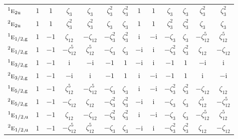 \documentclass[10pt,a4paper]{article}
\makeatletter
\def\grouprule#1#2{\noalign{\marks\LTgroupmarks{\the\belowrulesep}\nobreak\vskip#1%
  \vskip\aboverulesep}\multispan\LT@cols\unskip{\leaders\hrule\@height#2\hfill\kern\z@}\cr
  \noalign{\penalty\LTrulebreak\vskip\belowrulesep\global\@lastruleclass\z@}}
\numberwithin{equation}{section}
\newcommand{\irr}[1]{\text{\normalfont\scshape #1}}
\newcommand{\conjpair}[1]{{}^{#1}}
\newcommand{\ptag}[1]{\mathrm{#1}}
\newcommand{\iunit}{\mathrm{i}}
\newcommand{\rootunity}[1]{\zeta_{#1}}
\makeatother
\begin{document}
{\begin{longtable}{@{}lcccccccccccc@{}}
$\conjpair{1}\irr{e}_{2\ptag{u}}$ & $1$ & $1$ & $\rootunity{3}$ & $\rootunity{3}$ & $\rootunity{3}^{2}$ & $\rootunity{3}^{2}$ & $1$ & $1$ & $\rootunity{3}$ & $\rootunity{3}$ & $\rootunity{3}^{2}$ & $\rootunity{3}^{2}$\\
$\conjpair{2}\irr{e}_{2\ptag{u}}$ & $1$ & $1$ & $\rootunity{3}^{2}$ & $\rootunity{3}^{2}$ & $\rootunity{3}$ & $\rootunity{3}$ & $1$ & $1$ & $\rootunity{3}^{2}$ & $\rootunity{3}^{2}$ & $\rootunity{3}$ & $\rootunity{3}$\\
\grouprule{0pt}{\lightrulewidth}
$\conjpair{1}\irr{e}_{1/2,\ptag{g}}$ & $1$ & $-1$ & $\rootunity{12}$ & $-\rootunity{12}$ & $-\rootunity{3}^{2}$ & $\rootunity{3}^{2}$ & $\iunit{}$ & $-\iunit{}$ & $-\rootunity{3}$ & $\rootunity{3}$ & $-\rootunity{12}^{5}$ & $\rootunity{12}^{5}$\\
$\conjpair{2}\irr{e}_{1/2,\ptag{g}}$ & $1$ & $-1$ & $-\rootunity{12}^{5}$ & $\rootunity{12}^{5}$ & $-\rootunity{3}$ & $\rootunity{3}$ & $-\iunit{}$ & $\iunit{}$ & $-\rootunity{3}^{2}$ & $\rootunity{3}^{2}$ & $\rootunity{12}$ & $-\rootunity{12}$\\
$\conjpair{1}\irr{e}_{3/2,\ptag{g}}$ & $1$ & $-1$ & $\iunit{}$ & $-\iunit{}$ & $-1$ & $1$ & $-\iunit{}$ & $\iunit{}$ & $-1$ & $1$ & $-\iunit{}$ & $\iunit{}$\\
$\conjpair{2}\irr{e}_{3/2,\ptag{g}}$ & $1$ & $-1$ & $-\iunit{}$ & $\iunit{}$ & $-1$ & $1$ & $\iunit{}$ & $-\iunit{}$ & $-1$ & $1$ & $\iunit{}$ & $-\iunit{}$\\
$\conjpair{1}\irr{e}_{5/2,\ptag{g}}$ & $1$ & $-1$ & $\rootunity{12}^{5}$ & $-\rootunity{12}^{5}$ & $-\rootunity{3}$ & $\rootunity{3}$ & $\iunit{}$ & $-\iunit{}$ & $-\rootunity{3}^{2}$ & $\rootunity{3}^{2}$ & $-\rootunity{12}$ & $\rootunity{12}$\\
$\conjpair{2}\irr{e}_{5/2,\ptag{g}}$ & $1$ & $-1$ & $-\rootunity{12}$ & $\rootunity{12}$ & $-\rootunity{3}^{2}$ & $\rootunity{3}^{2}$ & $-\iunit{}$ & $\iunit{}$ & $-\rootunity{3}$ & $\rootunity{3}$ & $\rootunity{12}^{5}$ & $-\rootunity{12}^{5}$\\
$\conjpair{1}\irr{e}_{1/2,\ptag{u}}$ & $1$ & $-1$ & $\rootunity{12}$ & $-\rootunity{12}$ & $-\rootunity{3}^{2}$ & $\rootunity{3}^{2}$ & $\iunit{}$ & $-\iunit{}$ & $-\rootunity{3}$ & $\rootunity{3}$ & $-\rootunity{12}^{5}$ & $\rootunity{12}^{5}$\\
$\conjpair{2}\irr{e}_{1/2,\ptag{u}}$ & $1$ & $-1$ & $-\rootunity{12}^{5}$ & $\rootunity{12}^{5}$ & $-\rootunity{3}$ & $\rootunity{3}$ & $-\iunit{}$ & $\iunit{}$ & $-\rootunity{3}^{2}$ & $\rootunity{3}^{2}$ & $\rootunity{12}$ & $-\rootunity{12}$\\

\end{longtable}}
\end{document}
